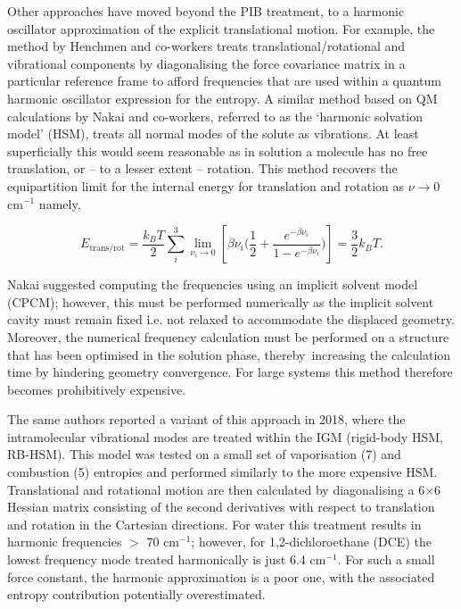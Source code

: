\documentclass[../main.tex]{subfiles}
\begin{document}
Other approaches have moved beyond the PIB treatment, to a harmonic oscillator approximation of the explicit translational motion. For example, the method by Henchmen and co-workers treats  translational/rotational and vibrational components by diagonalising the force covariance matrix in a particular reference frame to afford frequencies that are used within a quantum harmonic oscillator expression for the entropy.\cite{Chakravorty2020, Ali2019} A similar method based on QM calculations by Nakai and co-workers, referred to as the `harmonic solvation model' (HSM), treats all normal modes of the solute as vibrations.\cite{Nakai2014} At least superficially this would seem reasonable as in solution a molecule has no free translation, or -- to a lesser extent -- rotation. This method recovers the equipartition limit for the internal energy for translation and rotation as $\nu \rightarrow 0$ cm$^{-1}$ namely,

\begin{equation}
E_\text{trans/rot} = \frac{k_B T}{2} \sum_i^3 \lim\limits_{\nu_i \rightarrow 0} \left[ {\beta\nu_i} {\Big (} \frac{1}{2} + \frac{e^{-\beta\nu_i}}{1-e^{-\beta\nu_i}} {\Big )}\right] = \frac{3}{2} k_B T.
\end{equation} 

Nakai suggested computing the frequencies using an implicit solvent model (CPCM); however, this must be performed numerically as the implicit solvent cavity must remain fixed i.e. not relaxed to accommodate the displaced geometry. Moreover, the numerical frequency calculation must be performed on a structure that has been optimised in the solution phase, thereby increasing the calculation time by hindering geometry convergence. For large systems this method therefore becomes prohibitively expensive.


The same authors reported a variant of this approach in 2018,\cite{Tarumi2018} where the intramolecular vibrational modes are treated within the IGM (rigid-body HSM, RB-HSM). This model was tested on a small set of vaporisation (7) and combustion (5) entropies and performed similarly to the more expensive HSM. Translational and rotational motion are then calculated by diagonalising a 6$\times$6 Hessian matrix consisting of the second derivatives with respect to translation and rotation in the Cartesian directions. For water this treatment results in harmonic frequencies $>$ 70 cm$^{-1}$; however, for 1,2-dichloroethane (DCE) the lowest frequency mode treated harmonically is just 6.4 cm$^{-1}$. For such a small force constant, the harmonic approximation is a poor one, with the associated entropy contribution potentially overestimated.
\end{document}
